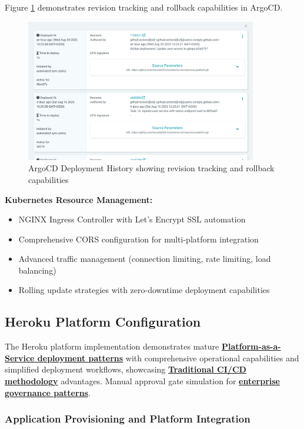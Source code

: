 Figure \ref{fig:argocd-deployment-history} demonstrates revision tracking and rollback capabilities in ArgoCD.

\begin{figure}[H]
\centering
\includegraphics[width=0.9\textwidth]{figures/chapter5/argocd-deployment-history.png}
\caption{ArgoCD Deployment History showing revision tracking and rollback capabilities}
\label{fig:argocd-deployment-history}
\end{figure}


\textbf{Kubernetes Resource Management:}
\begin{itemize}
\item NGINX Ingress Controller with Let's Encrypt SSL automation
\item Comprehensive CORS configuration for multi-platform integration
\item Advanced traffic management (connection limiting, rate limiting, load balancing)
\item Rolling update strategies with zero-downtime deployment capabilities
\end{itemize}

\subsection{Heroku Platform Configuration}

The Heroku platform implementation demonstrates mature \textbf{\hyperref[paas2022]{Platform-as-a-Service deployment patterns}} with comprehensive operational capabilities and simplified deployment workflows, showcasing \textbf{\hyperref[cicd2020]{Traditional CI/CD methodology}} advantages. Manual approval gate simulation for \textbf{\hyperref[approvals2021]{enterprise governance patterns}}.


\subsubsection{Application Provisioning and Platform Integration}



